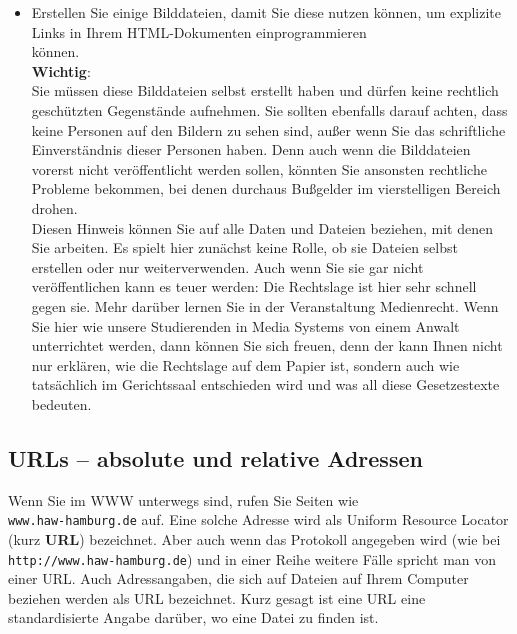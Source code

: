 \begin{itemize}
	\item Erstellen Sie einige Bilddateien, damit Sie diese nutzen können, um explizite Links in Ihrem HTML-Dokumenten einprogrammieren\\ können.\\
	
	\textbf{Wichtig}:\\
	
	Sie müssen diese Bilddateien selbst erstellt haben und dürfen keine rechtlich geschützten Gegenstände aufnehmen. Sie sollten ebenfalls darauf achten, dass keine Personen auf den Bildern zu sehen sind, außer wenn Sie das schriftliche Einverständnis dieser Personen haben. Denn auch wenn die Bilddateien vorerst nicht veröffentlicht werden sollen, könnten Sie ansonsten rechtliche Probleme bekommen, bei denen durchaus Bußgelder im vierstelligen Bereich drohen.\\
	
	Diesen Hinweis können Sie auf alle Daten und Dateien beziehen, mit denen Sie arbeiten. Es spielt hier zunächst keine Rolle, ob sie Dateien selbst erstellen oder \glqq{}nur\grqq{} weiterverwenden. Auch wenn Sie sie gar nicht veröffentlichen kann es teuer werden: Die Rechtslage ist hier sehr schnell gegen sie. Mehr darüber lernen Sie in der Veranstaltung Medienrecht. Wenn Sie hier wie unsere Studierenden in Media Systems von einem Anwalt unterrichtet werden, dann können Sie sich freuen, denn der kann Ihnen nicht nur erklären, wie die Rechtslage auf dem Papier ist, sondern auch wie tatsächlich im Gerichtssaal entschieden wird und was all diese Gesetzestexte bedeuten.
\end{itemize}

\subsection{URLs – absolute und relative Adressen}

Wenn Sie im WWW unterwegs sind, rufen Sie Seiten wie \\\verb|www.haw-hamburg.de| auf. Eine solche Adresse wird als Uniform Resource Locator (kurz \textbf{URL}) bezeichnet. Aber auch wenn das Protokoll angegeben wird (wie bei \verb|http://www.haw-hamburg.de|) und in einer Reihe weitere Fälle spricht man von einer URL. Auch \glqq{}Adressangaben\grqq{}, die sich auf Dateien auf Ihrem Computer beziehen werden als URL bezeichnet. Kurz gesagt ist eine URL eine standardisierte Angabe darüber, wo eine Datei zu finden ist.\\

